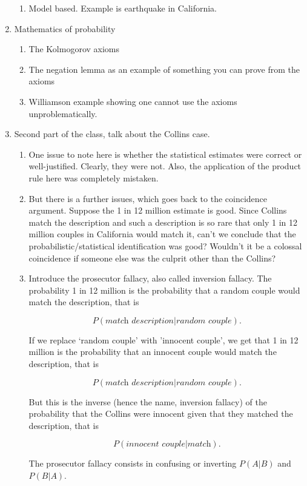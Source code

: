 \documentclass[16pt]{article}
\begin{document}
\begin{enumerate}
\begin{enumerate}
\item Model based. Example is earthquake in California.
\end{enumerate}
%
\item Mathematics of probability
\begin{enumerate}
\item The Kolmogorov axioms
\item The negation lemma as an example of something you can prove from the axioms
\item Williamson example showing one cannot use the axioms unproblematically. 
\end{enumerate}
%
\item Second part of the class, talk about the Collins case.
\begin{enumerate}
\item One issue to note here is whether the statistical estimates were correct or well-justified. Clearly, they were not. Also, the application of the product rule here was completely mistaken.
\item But there is a further issues, which goes back to the coincidence argument. Suppose the 1 in 12 million estimate is good. Since Collins match the description and such a description is so rare that only 1 in 12 million couples in California would match it, can't we conclude that the probabilistic/statistical identification was good? Wouldn't it be a colossal coincidence if someone else was the culprit other than the Collins?
\item Introduce the prosecutor fallacy, also called inversion fallacy. The probability 1 in 12 million is the probability that a random couple would match the description, that is

\[P(\textit{match description}| \textit{random couple}).\]

 If we replace `random couple' with 'innocent couple', we get that 1 in 12 million is the probability that an innocent couple would match the description, that is
 
 \[P(\textit{match description}| \textit{random couple}).\]
 
  But this is the inverse (hence the name, inversion fallacy) of the probability that the Collins were innocent given that they matched the description, that is
  
  \[P(\textit{innocent couple}| \textit{match}).\]

  
 The prosecutor fallacy consists in confusing or inverting  $P(A| B)$ and $P(B|A)$.
 

\end{enumerate}
\end{enumerate}
\end{document}
